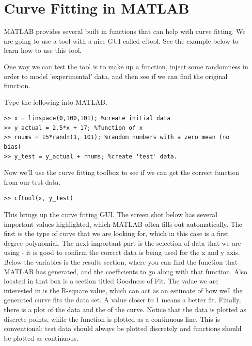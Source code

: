 \documentclass[paper=a4, fontsize=11pt]{scrartcl} %
\numberwithin{equation}{section} %
\numberwithin{figure}{section} %
\numberwithin{table}{section} %
\begin{document}
\section{Curve Fitting in MATLAB}
MATLAB provides several built in functions that can help with curve fitting.
We are going to use a tool with a nice GUI called cftool.
See the example below to learn how to use this tool.

One way we can test the tool is to make up a function, inject some randomness in order to model 'experimental' data, and then see if we can find the original function.

Type the following into MATLAB.
\begin{verbatim}
>> x = linspace(0,100,101); %create initial data
>> y_actual = 2.5*x + 17; %function of x
>> rnums = 15*randn(1, 101); %random numbers with a zero mean (no bias)
>> y_test = y_actual + rnums; %create 'test' data.
\end{verbatim}

Now we'll use the curve fitting toolbox to see if we can get the correct function from our test data.
\begin{verbatim}
>> cftool(x, y_test)
\end{verbatim}

This brings up the curve fitting GUI. The screen shot below has several important values highlighted, which MATLAB often fills out automatically. 
The first is the type of curve that we are looking for, which in this case is a first degree polynomial.
The next important part is the selection of data that we are using - it is good to confirm the correct data is being used for the x and y axis.
Below the variables is the results section, where you can find the function that MATLAB has generated, and the coefficients to go along with that function.
Also located in that box is a section titled Goodness of Fit. 
The value we are interested in is the R-square value, which can act as an estimate of how well the generated curve fits the data set.
A value closer to 1 means a better fit.
Finally, there is a plot of the data and the of the curve.
Notice that the data is plotted as discrete points, while the function is plotted as a continuous line. 
This is conventional; test data should always be plotted discretely and functions should be plotted as continuous.
\end{document}
